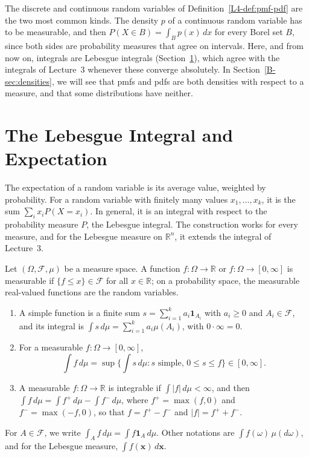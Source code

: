 The discrete and continuous random variables of Definition~\ref{L4-def:pmf-pdf} are the two most common kinds. The density $p$ of a continuous random variable has to be measurable, and then $P(X \in B) = \int_B p(x)\, dx$ for every Borel set $B$, since both sides are probability measures that agree on intervals. Here, and from now on, integrals are Lebesgue integrals (Section~\ref{B-sec:lebesgue}), which agree with the integrals of Lecture~3 whenever these converge absolutely. In Section~\ref{B-sec:densities}, we will see that pmfs and pdfs are both densities with respect to a measure, and that some distributions have neither.

\section{The Lebesgue Integral and Expectation}\label{B-sec:lebesgue}

The expectation of a random variable is its average value, weighted by probability. For a random variable with finitely many values $x_1, \ldots, x_k$, it is the sum $\sum_i x_iP(X = x_i)$. In general, it is an integral with respect to the probability measure $P$, the Lebesgue integral. The construction works for every measure, and for the Lebesgue measure on $\mathbb{R}^n$, it extends the integral of Lecture~3.

Let $(\Omega, \mathcal{F}, \mu)$ be a measure space. A function $f: \Omega \to \mathbb{R}$ or $f: \Omega \to [0, \infty]$ is measurable if $\{f \leq x\} \in \mathcal{F}$ for all $x \in \mathbb{R}$; on a probability space, the measurable real-valued functions are the random variables.

\begin{definition}\label{B-def:lebesgue}
    \begin{enumerate}
        \item A simple function is a finite sum $s = \sum_{i=1}^k a_i\mathbf{1}_{A_i}$ with $a_i \geq 0$ and $A_i \in \mathcal{F}$, and its integral is $\int s\, d\mu = \sum_{i=1}^k a_i\mu(A_i)$, with $0 \cdot \infty = 0$.
        \item For a measurable $f: \Omega \to [0, \infty]$,
        \[\int f\, d\mu = \sup\Big\{\int s\, d\mu : s \text{ simple, } 0 \leq s \leq f\Big\} \in [0, \infty].\]
        \item A measurable $f: \Omega \to \mathbb{R}$ is integrable if $\int |f|\, d\mu < \infty$, and then $\int f\, d\mu = \int f^+\, d\mu - \int f^-\, d\mu$, where $f^+ = \max(f, 0)$ and $f^- = \max(-f, 0)$, so that $f = f^+ - f^-$ and $|f| = f^+ + f^-$.
    \end{enumerate}
    For $A \in \mathcal{F}$, we write $\int_A f\, d\mu = \int f\mathbf{1}_A\, d\mu$. Other notations are $\int f(\omega)\, \mu(d\omega)$, and for the Lebesgue measure, $\int f(\mathbf{x})\, d\mathbf{x}$.
\end{definition}

